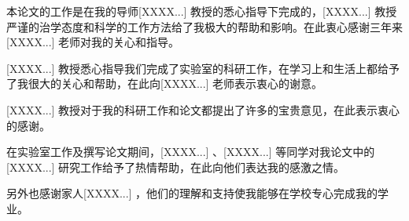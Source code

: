 
\begin{thanks}

    本论文的工作是在我的导师[XXXX...] 教授的悉心指导下完成的，[XXXX...] 教授严谨的治学态度和科学的工作方法给了我极大的帮助和影响。在此衷心感谢三年来[XXXX...] 老师对我的关心和指导。

    [XXXX...] 教授悉心指导我们完成了实验室的科研工作，在学习上和生活上都给予了我很大的关心和帮助，在此向[XXXX...] 老师表示衷心的谢意。

    [XXXX...] 教授对于我的科研工作和论文都提出了许多的宝贵意见，在此表示衷心的感谢。

    在实验室工作及撰写论文期间，[XXXX...] 、[XXXX...] 等同学对我论文中的[XXXX...] 研究工作给予了热情帮助，在此向他们表达我的感激之情。
    
    另外也感谢家人[XXXX...] ，他们的理解和支持使我能够在学校专心完成我的学业。
    

\end{thanks}
